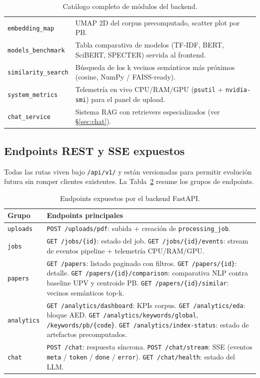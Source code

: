 \documentclass[11pt,a4paper]{article}
\newcommand{\modulo}[1]{\texttt{\textcolor{accent}{#1}}}
\begin{document}
\begin{table}[h]
\begin{tabularx}{\linewidth}{l X}
\modulo{embedding\_map} & UMAP 2D del corpus precomputado, scatter plot por PB. \\
\modulo{models\_benchmark} & Tabla comparativa de modelos (TF-IDF, BERT, SciBERT, SPECTER) servida al frontend. \\
\modulo{similarity\_search} & Búsqueda de los k vecinos semánticos más próximos (cosine, NumPy / FAISS-ready). \\
\modulo{system\_metrics} & Telemetría en vivo CPU/RAM/GPU (\texttt{psutil} + \texttt{nvidia-smi}) para el panel de upload. \\
\modulo{chat\_service} & Sistema RAG con retrievers especializados (ver §\ref{sec:chat}). \\
\bottomrule
\end{tabularx}
\caption{Catálogo completo de módulos del backend.}
\label{tab:modulos}
\end{table}

\subsection{Endpoints REST y SSE expuestos}

Todas las rutas viven bajo \texttt{/api/v1/} y están versionadas para permitir evolución futura sin romper clientes existentes. La Tabla~\ref{tab:endpoints} resume los grupos de endpoints.

\begin{table}[h]
\centering\small
\begin{tabularx}{\linewidth}{l X}
\toprule
\textbf{Grupo} & \textbf{Endpoints principales} \\
\midrule
\texttt{uploads} & \texttt{POST /uploads/pdf}: subida + creación de \texttt{processing\_job}. \\
\texttt{jobs} & \texttt{GET /jobs/\{id\}}: estado del job. \texttt{GET /jobs/\{id\}/events}: stream de eventos pipeline + telemetría CPU/RAM/GPU. \\
\texttt{papers} & \texttt{GET /papers}: listado paginado con filtros. \texttt{GET /papers/\{id\}}: detalle. \texttt{GET /papers/\{id\}/comparison}: comparativa NLP contra baseline UPV y centroide PB. \texttt{GET /papers/\{id\}/similar}: vecinos semánticos top-k. \\
\texttt{analytics} & \texttt{GET /analytics/dashboard}: KPIs corpus. \texttt{GET /analytics/eda}: bloque AED. \texttt{GET /analytics/keywords/global}, \texttt{/keywords/pb/\{code\}}. \texttt{GET /analytics/index-status}: estado de artefactos precomputados. \\
\texttt{chat} & \texttt{POST /chat}: respuesta síncrona. \texttt{POST /chat/stream}: SSE (eventos \texttt{meta} / \texttt{token} / \texttt{done} / \texttt{error}). \texttt{GET /chat/health}: estado del LLM. \\
\bottomrule
\end{tabularx}
\caption{Endpoints expuestos por el backend FastAPI.}
\label{tab:endpoints}
\end{table}
\end{document}
